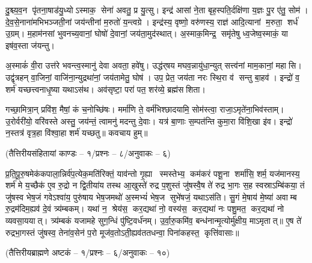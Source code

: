 दु॒श्च्य॒व॒न पृ॑तना॒षाड॑यु॒ध्योऽस्माक॒ सेना॑ अवतु॒ प्र यु॒त्सु। इन्द्र॑ आसां ने॒ता बृह॒स्पति॒र्दक्षि॑णा य॒ज्ञः पु॒र ए॑तु॒ सोम॑। दे॒व॒से॒नाना॑मभिभञ्जती॒नां जय॑न्तीनां म॒रुतो॑ य॒न्त्वग्रे। इन्द्र॑स्य॒ वृष्णो॒ वरु॑णस्य॒ राज्ञ॑ आदि॒त्यानां म॒रुता॒ शर्ध॑ उ॒ग्रम्। म॒हाम॑नसां भुवनच्य॒वानां॒ घोषो॑ दे॒वानां॒ जय॑ता॒मुद॑स्थात्। अ॒स्माक॒मिन्द्र॒ समृ॑तेषु ध्व॒जेष्व॒स्माकं॒ या इष॑व॒स्ता ज॑यन्तु।

अ॒स्माकं॑ वी॒रा उत्त॑रे भवन्त्व॒स्मानु॑ देवा अवता॒ हवे॑षु। उद्ध॑र्‌षय मघव॒न्नायु॑धा॒न्युत् सत्त्व॑नां माम॒कानां॒ महासि। उद्वृ॑त्रहन् वा॒जिनां॒ वाजि॑ना॒न्युद्रथा॑नां॒ जय॑तामेतु॒ घोष॑। उप॒ प्रेत॒ जय॑ता नरः स्थि॒रा व॑ सन्तु बा॒हव॑। इन्द्रो॑ व॒ शर्म॑ यच्छत्त्वनाधृ॒ष्या यथाऽस॑थ। अव॑सृष्टा॒ परा॑ पत॒ शर॑व्ये॒ ब्रह्म॑सशिता।

गच्छा॒मित्रा॒न् प्रवि॑श॒ मैषां॒ कं च॒नोच्छि॑षः। मर्मा॑णि ते॒ वर्म॑भिश्छादयामि॒ सोम॑स्त्वा॒ राजा॒ऽमृते॑ना॒भिव॑स्ताम्। उ॒रोर्वरी॑यो॒ वरि॑वस्ते अस्तु॒ जय॑न्तं॒ त्वामनु॑ मदन्तु दे॒वाः। यत्र॑ बा॒णाः स॒म्पत॑न्ति कुमा॒रा वि॑शि॒खा इ॑व। इन्द्रो॑ न॒स्तत्र॑ वृत्र॒हा वि॑श्वा॒हा शर्म॑ यच्छतु॥
कवचाय हुम्॥

{\small \closesection}

\centerline{\normalsize (तैत्तिरीयसंहितायां काण्डः – १/प्रश्नः – ८/अनुवाकः – ६)}

प्र॒ति॒पू॒रु॒षमेक॑कपाला॒न्निर्व॑प॒त्येक॒मति॑रिक्तं॒ याव॑न्तो गृ॒ह्या स्मस्तेभ्य॒ कम॑करं पशू॒ना शर्मा॑सि॒ शर्म॒ यज॑मानस्य॒ शर्म॑ मे य॒च्छैक॑ ए॒व रु॒द्रो न द्वि॒तीया॑य तस्थ आ॒खुस्ते॑ रुद्र प॒शुस्तं जु॑षस्वै॒ष ते॑ रुद्र भा॒गः स॒ह स्वस्राऽम्बि॑कया॒ तं जु॑षस्व भेष॒जं गवेऽश्वा॑य॒ पुरु॑षाय भेष॒जमथो॑ अ॒स्मभ्यं॑ भेष॒ज सुभे॑षजं॒ यथाऽस॑ति। सु॒गं मे॒षाय॑ मे॒ष्या॑ अवाम्ब रु॒द्रम॑दिम॒ह्यव॑ दे॒वं त्र्य॑म्बकम्। यथा॑ न॒ श्रेय॑स॒ कर॒द्यथा॑ नो॒ वस्य॑स॒ कर॒द्यथा॑ नः पशु॒मत॒ कर॒द्यथा॑ नो व्यवसा॒ययात्। त्र्य॑म्बकं यजामहे सुग॒न्धिं पु॑ष्टि॒वर्ध॑नम्। उ॒र्वा॒रु॒कमि॑व॒ बन्ध॑नान्मृ॒त्योर्मु॑क्षीय॒ माऽमृतात्॥ ए॒ष ते॑ रुद्रभा॒गस्तं जु॑षस्व॒ तेना॑व॒सेन॑ प॒रो मूज॑व॒तोऽती॒ह्यव॑ततधन्वा॒ पिना॑कहस्त॒ कृत्ति॑वासाः॥


\centerline{\normalsize (तैत्तिरीयब्राह्मणे अष्टकं – १/प्रश्नः – ६/अनुवाकः – १०)}

